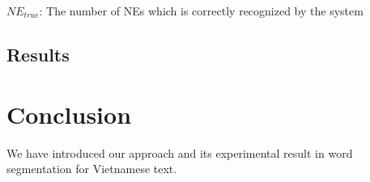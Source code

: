 \documentclass[11pt,a4paper]{article}
\begin{document}
$NE_{true}$: The number of NEs which is correctly recognized by the system

\subsection{Results}


\section{Conclusion}

We have introduced our approach and its experimental result in word segmentation for Vietnamese text.




\end{document}
